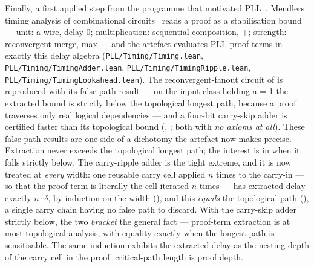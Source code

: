 Finally, a first applied step from the programme that motivated
PLL~\cite{FairtloughMendler1994}.
Mendler\textquotesingle s timing analysis of
combinational circuits~\cite{Mendler2000} reads a proof as a
stabilisation bound --- unit: a wire, delay 0; multiplication:
sequential composition, +; strength: reconvergent merge, max --- and
the artefact evaluates PLL proof terms in exactly this delay algebra
(\texttt{PLL/\allowbreak{}Timing/\allowbreak{}Timing.lean}, \texttt{PLL/\allowbreak{}Timing/\allowbreak{}TimingAdder.lean},
\texttt{PLL/\allowbreak{}Timing/\allowbreak{}TimingRipple.lean}, \texttt{PLL/\allowbreak{}Timing/\allowbreak{}TimingLookahead.lean}). The
reconvergent-fanout circuit of \cite[\S7]{Mendler2000} is reproduced
with its false-path result --- on the input class holding a = 1 the
extracted bound is strictly below the topological longest path,
because a proof traverses only real logical dependencies --- and a
four-bit carry-skip adder is certified faster than its topological
bound (,
; both with \emph{no
axioms at all}). These false-path results are one side of a dichotomy the artefact now
makes precise. Extraction never exceeds the topological longest path;
the interest is in when it falls strictly below. The carry-ripple
adder is the tight extreme, and it is now treated at \emph{every}
width: one reusable carry cell applied \ensuremath{n} times to the
carry-in --- so that the proof term is literally the cell iterated
\ensuremath{n} times --- has extracted delay exactly
\ensuremath{n\cdot\delta}, by induction on the width
(), and this \emph{equals} the topological path
(), a single carry chain having no false path to
discard. With the carry-skip adder strictly below, the two
\emph{bracket} the general fact --- proof-term extraction is at most
topological analysis, with equality exactly when the longest path is
sensitisable. The same induction exhibits the extracted delay as the
nesting depth of the carry cell in the proof: critical-path length is
proof depth.

